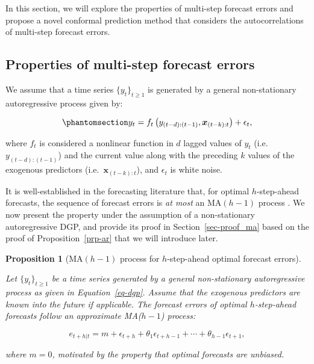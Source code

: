 \documentclass[
  11pt,
  a4paper,
]{article}
\theoremstyle{plain}
\newtheorem{proposition}{Proposition}[section]
\theoremstyle{remark}
\begin{document}
In this section, we will explore the properties of multi-step forecast
errors and propose a novel conformal prediction method that considers
the autocorrelations of multi-step forecast errors.

\subsection{Properties of multi-step forecast errors}\label{sec-ppt}

We assume that a time series \(\{y_t\}_{t \geq 1}\) is generated by a
general non-stationary autoregressive process given by:

\begin{equation}\phantomsection\label{eq-dgp}{
y_t = f_{t}\left(y_{(t-d):(t-1)},\bm{x}_{(t-k):t}\right) + \epsilon_t,
}\end{equation}

where \(f_{t}\) is considered a nonlinear function in \(d\) lagged
values of \(y_t\) (i.e.~\(y_{(t-d):(t-1)}\)) and the current value along
with the preceding \(k\) values of the exogenous predictors
(i.e.~\(\bm{x}_{(t-k):t}\)), and \(\epsilon_t\) is white noise.

It is well-established in the forecasting literature that, for optimal
\(h\)-step-ahead forecasts, the sequence of forecast errors is \emph{at
most} an MA\((h-1)\) process \autocite{harvey1997,diebold2017}. We now
present the property under the assumption of a non-stationary
autoregressive DGP, and provide its proof in Section~\ref{sec-proof_ma}
based on the proof of Proposition~\ref{prp-ar} that we will introduce
later.

\begin{proposition}[MA\((h-1)\) process for \(h\)-step-ahead optimal
forecast errors]\protect\hypertarget{prp-ma}{}\label{prp-ma}

Let \(\{y_t\}_{t \geq 1}\) be a time series generated by a general
non-stationary autoregressive process as given in Equation~\ref{eq-dgp}.
Assume that the exogenous predictors are known into the future if
applicable. The forecast errors of optimal \(h\)-step-ahead forecasts
follow an approximate MA(\(h-1\)) process:

\[
e_{t+h|t} = m + \epsilon_{t+h} + \theta_1\epsilon_{t+h-1} + \cdots + \theta_{h-1}\epsilon_{t+1},
\]

where \(m=0\), motivated by the property that optimal forecasts are
unbiased.

\end{proposition}
\end{document}
